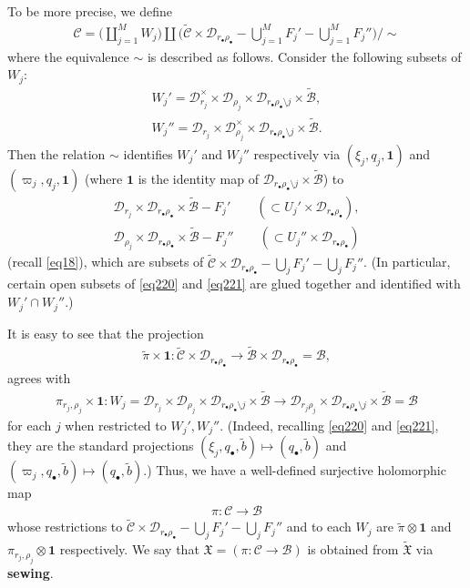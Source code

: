 \documentclass[12pt,a4paper,notitlepage]{report}
\theoremstyle{definition}
\theoremstyle{plain}
\newcommand{\fk}{\mathfrak}
\newcommand{\mc}{\mathcal}
\newcommand{\wtd}{\widetilde}
\newcommand{\id}{\mathbf{1}}
\newcommand{\blt}{\bullet}
\numberwithin{equation}{section}
\begin{document}
To be more precise, we define
\begin{align}
\mc C=\bigg(\coprod_{j=1}^MW_j\bigg)\coprod\bigg(\wtd{\mc C}\times \mc D_{r_\blt\rho_\blt}-\bigcup_{j=1}^M F_j'-\bigcup_{j=1}^M F_j''\bigg)\bigg/\sim \label{eq112}
\end{align}
where the equivalence $\sim$ is described as follows. Consider the following subsets of $W_j$:
\begin{gather}
W_j'=\mc D_{r_j}^\times\times\mc D_{\rho_j}\times\mc D_{r_\bullet\rho_\bullet\setminus j}\times\wtd{\mc B},\label{eq66}\\
W_j''= \mc D_{r_j}\times\mc D_{\rho_j}^\times\times\mc D_{r_\bullet\rho_\bullet\setminus j}\times\wtd{\mc B}.\label{eq67}
\end{gather}
Then the relation $\sim$ identifies $W_j'$ and $W_j''$  respectively via $(\xi_j,q_j,\id)$ and $(\varpi_j,q_j,\id)$ (where $\id$ is the identity map of $\mc D_{r_\blt\rho_\blt\setminus j}\times\wtd{\mc B}$) to
\begin{gather}
\mc D_{r_j}\times\mc D_{r_\blt\rho_\blt}\times\wtd{\mc B}-F_j'\qquad (\subset U_j'\times\mc D_{r_\blt\rho_\blt}),\label{eq220}\\
\mc D_{\rho_j}\times\mc D_{r_\blt\rho_\blt}\times\wtd{\mc B}-F_j''\qquad (\subset U_j''\times\mc D_{r_\blt\rho_\blt})\label{eq221}
\end{gather}
(recall \eqref{eq18}), which are subsets of $\wtd{\mc C}\times \mc D_{r_\blt\rho_\blt}-\bigcup_j F_j'-\bigcup_j F_j''$. (In particular, certain open subsets of \eqref{eq220} and \eqref{eq221} are glued together and identified with $W_j'\cap W_j''$.)

It is easy to see that the projection
\begin{align}
\wtd\pi\times \id:\wtd{\mc C}\times \mc D_{r_\blt\rho_\blt}\rightarrow \wtd{\mc B}\times \mc D_{r_\bullet\rho_\bullet}=\mc B,\label{eq234}
\end{align}
agrees with
\begin{gather}
\pi_{r_j,\rho_j}\times \id:W_j=\mc D_{r_j}\times\mc D_{\rho_j}\times\mc D_{r_\bullet\rho_\bullet\setminus j}\times\wtd{\mc B}\rightarrow \mc D_{r_j\rho_j}\times\mc D_{r_\bullet\rho_\bullet\setminus j}\times\wtd{\mc B}=\mc B\label{eq227}
\end{gather}
for each $j$ when restricted to $W_j',W_j''$. (Indeed, recalling \eqref{eq220} and \eqref{eq221}, they are the standard projections $(\xi_j,q_\blt,\wtd b)\mapsto(q_\blt,\wtd b)$ and $(\varpi_j,q_\blt,\wtd b)\mapsto(q_\blt,\wtd b)$.) Thus, we have a well-defined surjective holomorphic map
\begin{align*}
\pi:\mc C\rightarrow\mc B
\end{align*}
whose  restrictions to $\wtd{\mc C}\times \mc D_{r_\blt\rho_\blt}-\bigcup_j F_j'-\bigcup_j F_j''$ and to each $W_j$ are $\wtd\pi\otimes\id$ and $\pi_{r_j,\rho_j}\otimes\id$ respectively. We say that $\fk X=(\pi:\mc C\rightarrow\mc B)$ is obtained from $\wtd{\fk X}$ via \textbf{sewing}. 
\end{document}
